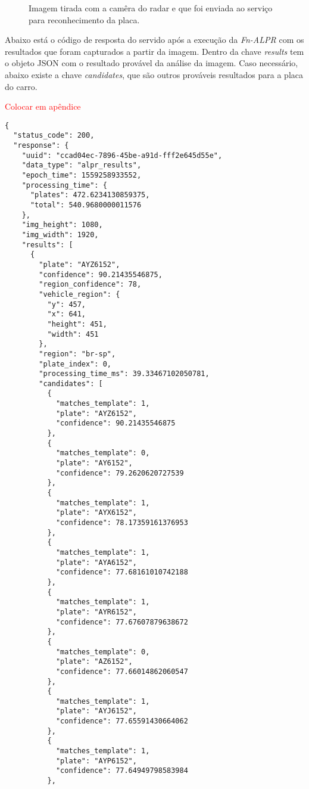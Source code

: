 \begin{figure}[H]
	\caption{\label{fig:teste-alpr-foto-carro} Imagem tirada com a camêra do radar e que foi enviada ao serviço para reconhecimento da placa.}
\end{figure}

Abaixo está o código de resposta do servido após a execução da \textit{Fn-ALPR} com os resultados que foram capturados a partir da imagem. Dentro da chave \textit{results} tem o objeto JSON com o resultado provável da análise da imagem. Caso necessário, abaixo existe a chave \textit{candidates}, que são outros prováveis resultados para a placa do carro.

\textcolor{red}{Colocar em apêndice} 
\begin{lstlisting}
{
  "status_code": 200,
  "response": {
    "uuid": "ccad04ec-7896-45be-a91d-fff2e645d55e",
    "data_type": "alpr_results",
    "epoch_time": 1559258933552,
    "processing_time": {
      "plates": 472.6234130859375,
      "total": 540.9680000011576
    },
    "img_height": 1080,
    "img_width": 1920,
    "results": [
      {
        "plate": "AYZ6152",
        "confidence": 90.21435546875,
        "region_confidence": 78,
        "vehicle_region": {
          "y": 457,
          "x": 641,
          "height": 451,
          "width": 451
        },
        "region": "br-sp",
        "plate_index": 0,
        "processing_time_ms": 39.33467102050781,
        "candidates": [
          {
            "matches_template": 1,
            "plate": "AYZ6152",
            "confidence": 90.21435546875
          },
          {
            "matches_template": 0,
            "plate": "AY6152",
            "confidence": 79.2620620727539
          },
          {
            "matches_template": 1,
            "plate": "AYX6152",
            "confidence": 78.17359161376953
          },
          {
            "matches_template": 1,
            "plate": "AYA6152",
            "confidence": 77.68161010742188
          },
          {
            "matches_template": 1,
            "plate": "AYR6152",
            "confidence": 77.67607879638672
          },
          {
            "matches_template": 0,
            "plate": "AZ6152",
            "confidence": 77.66014862060547
          },
          {
            "matches_template": 1,
            "plate": "AYJ6152",
            "confidence": 77.65591430664062
          },
          {
            "matches_template": 1,
            "plate": "AYP6152",
            "confidence": 77.64949798583984
          },

\end{lstlisting}
